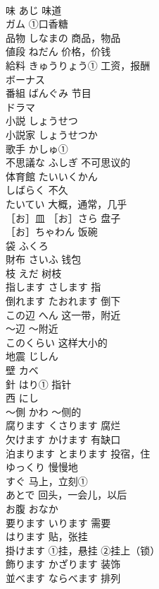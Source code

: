 \documentclass[8pt]{extreport}
\begin{document}
\begin{CJK}{UTF8}{min}
\\	味	あじ 味道	
\\	ガム	①口香糖	
\\	品物	しなまの 商品，物品	
\\	値段	ねだん 价格，价钱	
\\	給料	きゅうりょう① 工资，报酬	
\\	ボーナス	
\\	番組	ばんぐみ 节目	
\\	ドラマ	
\\	小説	しょうせつ	
\\	小説家	しょうせつか	
\\	歌手	かしゅ①	
\\	不思議な	ふしぎ 不可思议的	
\\	体育館	たいいくかん	
\\	しばらく	不久	
\\	たいてい	大概，通常，几乎	
\\	［お］皿	［お］さら 盘子	
\\	［お］ちゃわん	饭碗	
\\	袋	ふくろ	
\\	財布	さいふ 钱包	
\\	枝	えだ 树枝	
\\	指します	さします 指	
\\	倒れます	たおれます 倒下	
\\	この辺	へん 这一带，附近	
\\	〜辺	～附近	
\\	このくらい	这样大小的	
\\	地震	じしん	
\\	壁	カベ	
\\	針	はり① 指针	
\\	西	にし	
\\	〜側	かわ ～侧的	
\\	腐ります	くさります 腐烂	
\\	欠けます	かけます 有缺口	
\\	泊まります	とまります 投宿，住	
\\	ゆっくり	慢慢地	
\\	すぐ	马上，立刻①	
\\	あとで	回头，一会儿，以后	
\\	お腹	おなか	
\\	要ります	いります 需要	
\\	はります	贴，张挂	
\\	掛けます	①挂，悬挂 ②挂上（锁）	
\\	飾ります	かざります 装饰	
\\	並べます	ならべます 排列	

\end{CJK}
\end{document}
